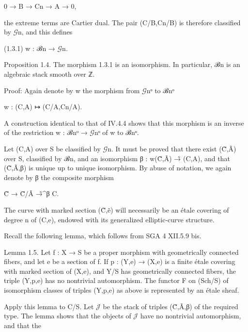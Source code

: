 \documentclass[11pt,a4paper]{article}
\begin{document}
0 → B → C\textunderscore{}n → A → 0,

the extreme terms are Cartier dual. The pair (C/B,C\textunderscore{}n/B) is therefore classified by \ensuremath{\mathcal{G}}\textunderscore{}n, and this defines

(1.3.1)        w : ℬ\textunderscore{}n → \ensuremath{\mathcal{G}}\textunderscore{}n.

Proposition 1.4. The morphism 1.3.1 is an isomorphism. In particular, ℬ\textunderscore{}n is an algebraic stack smooth over ℤ.

Proof: Again denote by w the morphism from \ensuremath{\mathcal{G}}\textunderscore{}nᵒ to ℬ\textunderscore{}nᵒ

w : (C,A) ↦ (C/A,C\textunderscore{}n/A).

A construction identical to that of IV.4.4 shows that this morphism is an inverse of the restriction w : ℬ\textunderscore{}nᵒ → \ensuremath{\mathcal{G}}\textunderscore{}nᵒ of w to ℬ\textunderscore{}nᵒ.

Let (C,A) over S be classified by \ensuremath{\mathcal{G}}\textunderscore{}n. It must be proved that there exist (C̃,Ã) over S, classified by ℬ\textunderscore{}n, and an isomorphism β : w(C̃,Ã) →̃ (C,A), and that (C̃,Ã,β) is unique up to unique isomorphism. By abuse of notation, we again denote by β the composite morphism

C̃ → C̃/Ã →̃\textasciicircum{}β C.

The curve with marked section (C̃,ẽ) will necessarily be an étale covering of degree n of (C,e), endowed with its generalized elliptic-curve structure.

Recall the following lemma, which follows from SGA 4 XII.5.9 bis.

Lemma 1.5. Let f : X → S be a proper morphism with geometrically connected fibers, and let e be a section of f. If p : (Y,e) → (X,e) is a finite étale covering with marked section of (X,e), and Y/S has geometrically connected fibers, the triple (Y,p,e) has no nontrivial automorphism. The functor F on (Sch/S) of isomorphism classes of triples (Y,p,e) as above is represented by an étale sheaf.

Apply this lemma to C/S. Let \ensuremath{\mathcal{J}} be the stack of triples (C̃,Ã,β) of the required type. The lemma shows that the objects of \ensuremath{\mathcal{J}} have no nontrivial automorphism, and that the
\end{document}
